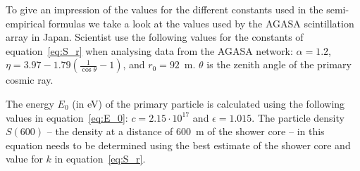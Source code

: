 To give an impression of the values for the different constants used in the semi-empirical formulas we take a look at the values used by the AGASA scintillation array in Japan. Scientist use the following values for the constants of equation~\ref{eq:S_r} when analysing data from the AGASA network: $\alpha=1.2$, $\eta=3.97 - 1.79 \left( \frac{1}{\cos \theta} - 1\right)$, and $r_0=92$~m. $\theta$ is the zenith angle of the primary cosmic ray.

The energy $E_0$ (in eV) of the primary particle is calculated using the following values in equation~\ref{eq:E_0}: $c=2.15 \cdot 10^{17}$ and $\epsilon=1.015$. The particle density $S(600)$ -- the density at a distance of 600~m of the shower core -- in this equation needs to be determined using the best estimate of the shower core and value for $k$ in equation~\ref{eq:S_r}.

